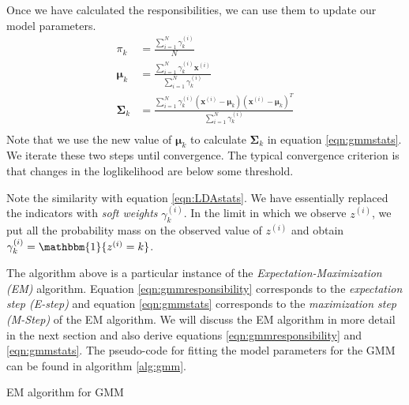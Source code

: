 \documentclass[final,3p,times,twocolumn]{elsarticle}
\begin{document}
Once we have calculated the responsibilities, we can use them to update our model parameters.
\begin{equation}
\label{eqn:gmmstats}
\begin{split}
\pi_k &= \frac{\sum_{i=1}^N \gamma_k^{(i)}}{N}\\
\boldsymbol \mu_k &= \frac{\sum_{i=1}^N \gamma_k^{(i)} \boldsymbol x^{(i)}}{\sum_{i=1}^N \gamma_k^{(i)}}\\
\boldsymbol \Sigma_k &= \frac{\sum_{i=1}^N \gamma_k^{(i)}(\boldsymbol x^{(i)} - \boldsymbol \mu_k)(\boldsymbol x^{(i)} - \boldsymbol \mu_k)^T}{\sum_{i=1}^N \gamma_k^{(i)}}\\
\end{split}
\end{equation}
Note that we use the new value of $\boldsymbol \mu_k$ to calculate $\boldsymbol \Sigma_k$ in equation \ref{eqn:gmmstats}.
We iterate these two steps until convergence.
The typical convergence criterion is that changes in the loglikelihood are below some threshold.

Note the similarity with equation \ref{eqn:LDAstats}.
We have essentially replaced the indicators with \emph{soft weights} $\gamma_k^{(i)}$.
In the limit in which we observe $z^{(i)}$, we put all the probability mass on the observed value of $z^{(i)}$ and obtain $\gamma_k^{(i)} = \mathbbm{1}\{z^{(i)} = k\}$.

The algorithm above is a particular instance of the \emph{Expectation-Maximization (EM)} algorithm.
Equation \ref{eqn:gmmresponsibility} corresponds to the \emph{expectation step (E-step)} and equation \ref{eqn:gmmstats} corresponds to the \emph{maximization step (M-Step)} of the EM algorithm.
We will discuss the EM algorithm in more detail in the next section and also derive equations \ref{eqn:gmmresponsibility} and \ref{eqn:gmmstats}.
The pseudo-code for fitting the model parameters for the GMM can be found in algorithm \ref{alg:gmm}.

\begin{algorithm}
\caption{EM algorithm for GMM}
\label{alg:gmm}
\begin{algorithmic}[1]
\Repeat
{}
\EndFor
{}
\EndFor
{}
\EndProcedure \\
\end{algorithmic}
\end{algorithm}
\end{document}
